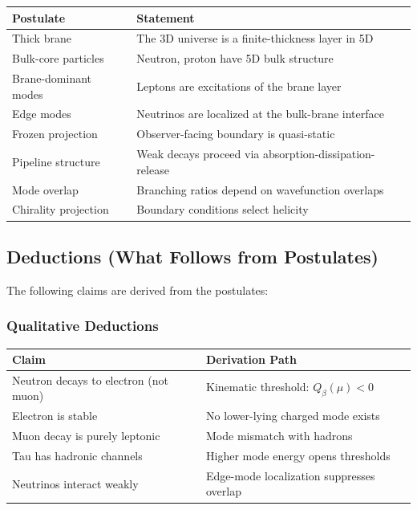 \begin{center}
\begin{tabular}{p{4cm}p{9cm}}
\toprule
\textbf{Postulate} & \textbf{Statement} \\
\midrule
Thick brane & The 3D universe is a finite-thickness layer in 5D \\
Bulk-core particles & Neutron, proton have 5D bulk structure \\
Brane-dominant modes & Leptons are excitations of the brane layer \\
Edge modes & Neutrinos are localized at the bulk-brane interface \\
Frozen projection & Observer-facing boundary is quasi-static \\
Pipeline structure & Weak decays proceed via absorption-dissipation-release \\
Mode overlap & Branching ratios depend on wavefunction overlaps \\
Chirality projection & Boundary conditions select helicity \\
\bottomrule
\end{tabular}
\end{center}

\subsection{Deductions (What Follows from Postulates)}

The following claims are derived from the postulates:

\subsubsection{Qualitative Deductions}

\begin{center}
\begin{tabular}{p{5cm}p{8cm}}
\toprule
\textbf{Claim} & \textbf{Derivation Path} \\
\midrule
Neutron decays to electron (not muon) & Kinematic threshold: $Q_\beta(\mu) < 0$ \\
Electron is stable & No lower-lying charged mode exists \\
Muon decay is purely leptonic & Mode mismatch with hadrons \\
Tau has hadronic channels & Higher mode energy opens thresholds \\
Neutrinos interact weakly & Edge-mode localization suppresses overlap \\
\bottomrule
\end{tabular}
\end{center}

